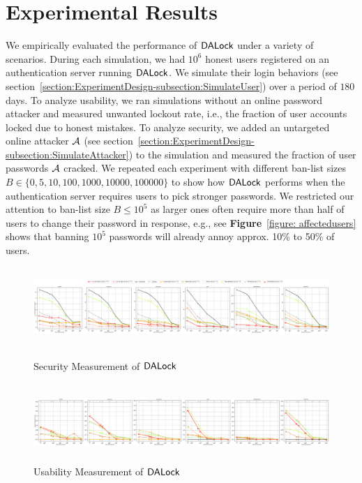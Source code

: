 
\section{Experimental Results}\label{section:experimentalresult} %

We empirically evaluated the performance of $\mathsf{DALock}$ under a variety of scenarios. During each simulation, we had $10^6$ honest users registered on an authentication server running $\mathsf{DALock}$. We simulate their login behaviors (see section~\ref{section:ExperimentDesign-subsection:SimulateUser}) over a period of $180$ days. To analyze usability, we ran simulations without an online password attacker and measured unwanted lockout rate, i.e., the fraction of user accounts locked due to honest mistakes. To analyze security, we added an untargeted online attacker $\mathcal{A}$ (see section~\ref{section:ExperimentDesign-subsection:SimulateAttacker}) to the simulation and measured the fraction of user passwords $\mathcal{A}$ cracked. We repeated each experiment with different ban-list sizes $B \in \{0, 5, 10, 100, 1000, 10000,100000\}$ to show how $\mathsf{DALock}$ performs when the authentication server requires users to pick stronger passwords. We restricted our attention to ban-list size $B \leq 10^5$ as larger ones often require more than half of users to change their password in response, e.g., see \textbf{Figure}~\ref{figure: affectedusers} shows that banning $10^5$ passwords will already annoy approx. 10\% to 50\%  of users. %



\begin{figure}[h]
	\includegraphics[width=\linewidth, height = 3cm]{Figures/Experiments/Attacker/SecurityBigPicture.png}
	\vspace{-0.2in}
	\caption{Security Measurement of $\mathsf{DALock}$ }\label{figure:Security}
	\includegraphics[width=\linewidth, height = 3cm]{Figures/Experiments/Utility/UsabilityBigPicture.png}
	\vspace{-0.2in}
	\caption{Usability Measurement of $\mathsf{DALock}$ }\label{figure:Usability}
\end{figure}




